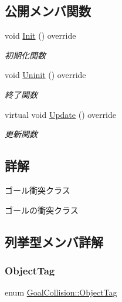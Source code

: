 \subsection*{公開メンバ関数}
\begin{DoxyCompactItemize}
\item 
void \mbox{\hyperlink{class_goal_collision_ab6089638f5390e019a55ae11952e1cf9}{Init}} () override
\begin{DoxyCompactList}\small\item\em 初期化関数 \end{DoxyCompactList}\item 
void \mbox{\hyperlink{class_goal_collision_ab818bad44ffcd595f1c495e659c0b348}{Uninit}} () override
\begin{DoxyCompactList}\small\item\em 終了関数 \end{DoxyCompactList}\item 
virtual void \mbox{\hyperlink{class_goal_collision_a1e3995dc2f5ba2678580d06699ca6936}{Update}} () override
\begin{DoxyCompactList}\small\item\em 更新関数 \end{DoxyCompactList}\end{DoxyCompactItemize}


\subsection{詳解}
ゴール衝突クラス 

ゴールの衝突クラス 

\subsection{列挙型メンバ詳解}
\mbox{\label{class_goal_collision_a8d0d760973816d9086df90491f38ff62}} 
\subsubsection{\texorpdfstring{Object\+Tag}{ObjectTag}}
{\footnotesize\ttfamily enum \mbox{\hyperlink{class_goal_collision_a8d0d760973816d9086df90491f38ff62}{Goal\+Collision\+::\+Object\+Tag}}}

